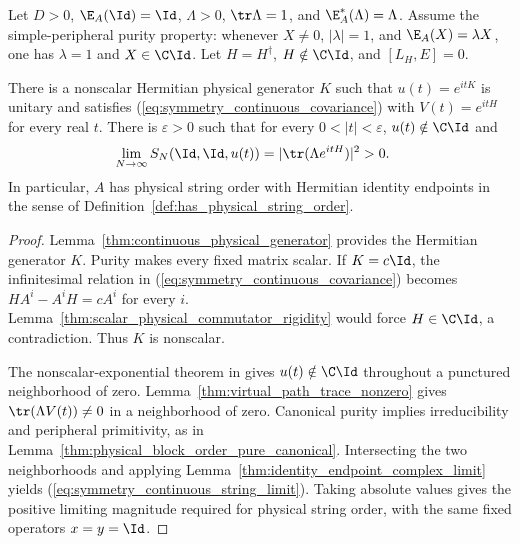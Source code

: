 \begin{lemma}
    \label{thm:continuous_generator_string_order}
    \leanok
    Let $D>0$, $\E_A(\Id)=\Id$, $\Lambda>0$, $\tr\Lambda=1$, and
    $\E_A^*(\Lambda)=\Lambda$. Assume the simple-peripheral purity
    property: whenever $X\ne0$, $|\lambda|=1$, and
    $\E_A(X)=\lambda X$, one has $\lambda=1$ and $X\in\C\Id$.
    Let $H=H^\dagger$, $H\notin\C\Id$, and $[L_H,E]=0$.

    There is a nonscalar Hermitian physical generator $K$ such that
    $u(t)=e^{itK}$ is unitary and satisfies
    (\ref{eq:symmetry_continuous_covariance}) with $V(t)=e^{itH}$
    for every real $t$.
    There is $\varepsilon>0$ such that for every $0<|t|<\varepsilon$,
    $u(t)\notin\C\Id$ and
    \begin{align}
        \lim_{N\to\infty}S_N(\Id,\Id,u(t))
         & =|\tr(\Lambda e^{itH})|^2>0.
        \label{eq:symmetry_continuous_string_limit}
    \end{align}
    In particular, $A$ has physical string order with Hermitian identity
    endpoints in the sense of Definition~\ref{def:has_physical_string_order}.
\end{lemma}
\begin{proof}\leanok
    Lemma~\ref{thm:continuous_physical_generator} provides the Hermitian
    generator $K$.
    Purity makes every fixed matrix scalar. If $K=c\Id$, the
    infinitesimal relation in (\ref{eq:symmetry_continuous_covariance})
    becomes $HA^i-A^iH=cA^i$ for every $i$.
    Lemma~\ref{thm:scalar_physical_commutator_rigidity} would force
    $H\in\C\Id$, a contradiction. Thus $K$ is nonscalar.

    The nonscalar-exponential theorem in
    \cite[``Hermitian exponential paths'']{QICLean2026Blueprint} gives
    $u(t)\notin\C\Id$ throughout a punctured neighborhood of zero.
    Lemma~\ref{thm:virtual_path_trace_nonzero} gives
    $\tr(\Lambda V(t))\ne0$ in a neighborhood of zero.
    Canonical purity implies irreducibility and peripheral primitivity,
    as in Lemma~\ref{thm:physical_block_order_pure_canonical}.
    Intersecting the two neighborhoods and applying
    Lemma~\ref{thm:identity_endpoint_complex_limit} yields
    (\ref{eq:symmetry_continuous_string_limit}). Taking absolute values
    gives the positive limiting magnitude required for physical string
    order, with the same fixed operators $x=y=\Id$.
\end{proof}
